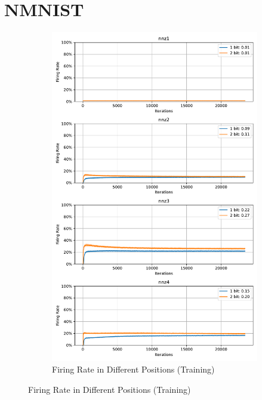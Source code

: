     \section{NMNIST}
    \label{appendix:firerate_nmnist}
        \begin{figure}[H]
            \centering
            \begin{subfigure}[H]{\textwidth}
                \centering
                \includegraphics[width=\textwidth]{../firerate/NMNIST/plots/nmnist_train_firerate.pdf}
                \caption{Firing Rate in Different Positions (Training)}
            \end{subfigure}
        \end{figure}

